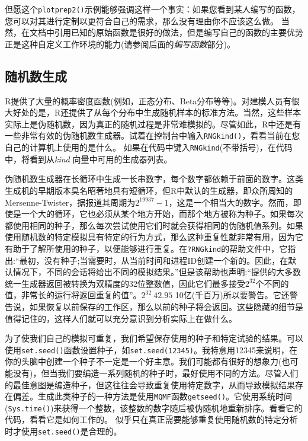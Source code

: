 \documentclass[
  lang=cn,
  11pt,
  scheme=chinese,
  chinesefont=nofont,
  citestyle=gb7714-2015,
  bibstyle=gb7714-2015]{elegantbook}
\begin{document}
但愿这个\texttt{plotprep2()}示例能够强调这样一个事实：如果您看到某人编写的函数，您可以对其进行定制以更符合自己的需求，那么没有理由你不应该这么做。 当然，在文档中引用已知的原始函数是很好的做法，但是编写自己的函数的主要优势正是这种自定义工作环境的能力(请参阅后面的\emph{编写函数}部分)。

\subsection{随机数生成}\label{ux968fux673aux6570ux751fux6210}

R提供了大量的概率密度函数(例如，正态分布、Beta分布等等)。对建模人员有很大好处的是，R还提供了从每个分布中生成随机样本的标准方法。当然，这些样本实际上是伪随机数，因为真正的随机过程是非常难模拟的。尽管如此，R中还是有一些非常有效的伪随机数生成器。试着在控制台中输入\texttt{RNGkind()}，看看当前在您自己的计算机上使用的是什么。 如果在代码中键入\texttt{RNGkind}(不带括号)，在代码中，将看到从\emph{kind} 向量中可用的生成器列表。

伪随机数生成器在长循环中生成一长串数字，每个数字都依赖于前面的数字。这类生成机的早期版本臭名昭著地具有短循环，但R中默认的生成器，即众所周知的Mersenne-Twister，据报道其周期为\(2^{19937} - 1\)，这是一个相当大的数字。然而，即使是一个大的循环，它也必须从某个地方开始，而那个地方被称为种子。如果每次都使用相同的种子，那么每次尝试使用它们时就会获得相同的伪随机值系列。如果使用随机数的特定模拟具有特定的行为方式，那么这种重复性就非常有用，因为它有助于了解所使用的种子，以便能够进行重复。在\texttt{?RNGkind}的帮助文件中，它指出:``最初，没有种子;当需要时，从当前时间和进程ID创建一个新的。因此，在默认情况下，不同的会话将给出不同的模拟结果。''但是该帮助也声明:``提供的大多数统一生成器返回被转换为双精度的32位整数值，因此它们最多接受\(2^{32}\)个不同的值，非常长的运行将返回重复的值''。\(2^{32} ~ 42.95\) 10亿(千百万)所以要警告。它还警告说，如果恢复以前保存的工作区，那么以前的种子将会返回。这些隐藏的细节是值得记住的，这样人们就可以充分意识到分析实际上在做什么。

为了使我们自己的模拟可重复，我们希望保存使用的种子和特定试验的结果。可以使用\texttt{set.seed()}函数设置种子，如\texttt{set.seed(12345)}。我特意用12345来说明，在你的头脑中创建一个种子不一定是一个好主意。我们可能都有很好的想象力(也可能没有)，但当我们要编造一系列随机的种子时，最好使用不同的方法。尽管人们的最佳意图是编造种子，但这往往会导致重复使用特定数字，从而导致模拟结果存在偏差。生成此类种子的一种方法是使用\texttt{MQMF}函数\texttt{getseed()}。它使用系统时间(\texttt{Sys.time()})来获得一个整数，该整数的数字随后被伪随机地重新排序。看看它的代码，看看它是如何工作的。 似乎只在真正需要能够重复使用随机数的特定分析时才使用\texttt{set.seed()}是合理的。
\end{document}

